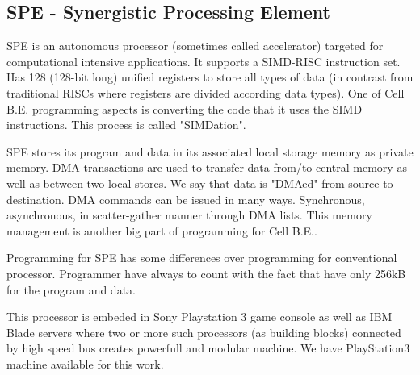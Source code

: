 \subsection{SPE - Synergistic Processing Element}
SPE is an autonomous processor (sometimes called accelerator) targeted for computational intensive applications.
It supports a SIMD-RISC instruction set.
Has 128 (128-bit long) unified registers to store all types of data (in contrast from traditional RISCs where registers are divided according data types).
One of Cell B.E. programming aspects is converting the code that it uses the SIMD instructions.
This process is called "SIMDation".

SPE stores its program and data in its associated local storage memory as private memory.
DMA transactions are used to transfer data from/to central memory as well as between two local stores.
We say that data is "DMAed" from source to destination.
DMA commands can be issued in many ways.
Synchronous, asynchronous, in scatter-gather manner through DMA lists.
This memory management is another big part of programming for Cell B.E..

Programming for SPE has some differences over programming for conventional processor.
Programmer have always to count with the fact that have only 256kB for the program and data.

This processor is embeded in Sony Playstation 3 game console as well as IBM Blade servers where two or more such processors (as building blocks) connected by high speed bus creates powerfull and modular machine.
We have PlayStation3 machine available for this work.